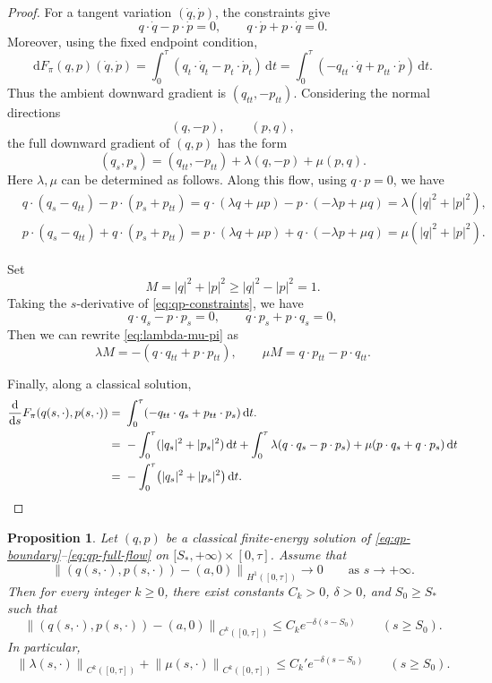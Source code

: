 \documentclass[11pt]{amsart}
\theoremstyle{plain}
\newtheorem{prop}[thm]{Proposition}
\theoremstyle{definition}
\newcommand{\dd}{\mathrm d}
\newcommand{\Norm}[1]{\left\lVert #1\right\rVert}
\begin{document}
\begin{proof}
For a tangent variation $(\dot q,\dot p)$, the constraints give
\[
q\cdot \dot q-p\cdot \dot p=0,\qquad
q\cdot \dot p+p\cdot \dot q=0.
\]
Moreover, using the fixed endpoint condition,
\[
\dd F_\pi(q,p)(\dot q,\dot p)=\int_0^\tau (q_t\cdot \dot q_t-p_t\cdot \dot p_t)\,\dd t
=\int_0^\tau (-q_{tt}\cdot \dot q+p_{tt}\cdot \dot p)\,\dd t .
\]
Thus the ambient downward gradient is $(q_{tt},-p_{tt})$. Considering the normal directions
\[
(q,-p), \qquad (p,q),
\]
the full downward gradient of $(q,p)$ has the form
\[
(q_s,p_s)=(q_{tt},-p_{tt})+\lambda(q,-p)+\mu(p,q).
\]
Here $\lambda,\mu$ can be determined as follows. Along this flow, using $q\cdot p=0$, we have
\begin{align*}
    &q\cdot(q_s-q_{tt})-p\cdot(p_s+p_{tt})=q\cdot(\lambda q+\mu p)-p\cdot(-\lambda p+\mu q)=\lambda(|q|^2+|p|^2),\\
    &p\cdot(q_s-q_{tt})+q\cdot(p_s+p_{tt})=p\cdot(\lambda q+\mu p)+q\cdot(-\lambda p+\mu q)=\mu(|q|^2+|p|^2).
\end{align*}

Set
\[
 M=|q|^2+|p|^2\geq |q|^2-|p|^2=1.
\]
Taking the $s$-derivative of \eqref{eq:qp-constraints}, we have
\[
 q\cdot q_s-p\cdot p_s=0,
 \qquad
 q\cdot p_s+p\cdot q_s=0,
\]
Then we can rewrite \eqref{eq:lambda-mu-pi} as
\[
 \lambda M
 =
 -(q\cdot q_{tt}+p\cdot p_{tt}),
 \qquad
 \mu M
 =
 q\cdot p_{tt}-p\cdot q_{tt}.
\]

Finally, along a classical solution,
\begin{align*}
\frac{\dd}{\dd s}F_\pi(q(s,\cdot),p(s,\cdot))
=~&\int_0^\tau (-q_{tt}\cdot q_s+p_{tt}\cdot p_s)\,\dd t.\\
=~&-\int_0^\tau (|q_s|^2+|p_s|^2)\,\dd t+
\int_0^\tau\lambda(q\cdot q_s-p\cdot p_s)+\mu(p\cdot q_s+q\cdot p_s)\,\dd t\\
=~&-\int_0^\tau \bigl(|q_s|^2+|p_s|^2\bigr)\,\dd t. \qedhere
\end{align*}
\end{proof}



\begin{prop}\label{prop:morse-end-C0}
Let $(q,p)$ be a classical finite-energy solution of
\eqref{eq:qp-boundary}--\eqref{eq:qp-full-flow} on
$[S_*,+\infty)\times [0,\tau]$.  Assume that
\begin{equation}\label{eq:H1-positive-end}
\Norm{(q(s,\cdot),p(s,\cdot))-(a,0)}_{H^1([0,\tau])}\to 0
\qquad\text{as }s\to +\infty .
\end{equation}
Then for every integer $k\ge 0$, there exist constants
$C_k>0$, $\delta>0$, and $S_0\ge S_*$ such that
\[
\Norm{(q(s,\cdot),p(s,\cdot))-(a,0)}_{C^k([0,\tau])}
\le C_k e^{-\delta(s-S_0)}
\qquad (s\ge S_0).
\]
In particular,
\[
\Norm{\lambda(s,\cdot)}_{C^k([0,\tau])}
+
\Norm{\mu(s,\cdot)}_{C^k([0,\tau])}
\le C_k' e^{-\delta(s-S_0)}
\qquad (s\ge S_0).
\]
\end{prop}
\end{document}
